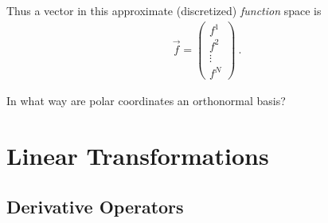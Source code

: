 \documentclass[
  11pt,
	colorful,
	raggedright,
]{tufte-style-thesis-flip}
\begin{document}
Thus a vector in this approximate (discretized) \emph{function} space is 
\begin{align}
  \vec{f} = 
  \begin{pmatrix}
    f^1 \\
    f^2 \\
    \vdots\\
    f^N
  \end{pmatrix} \ .
\end{align}



In what way are polar coordinates an orthonormal basis? 


\section{Linear Transformations}

\subsection{Derivative Operators}
\end{document}
